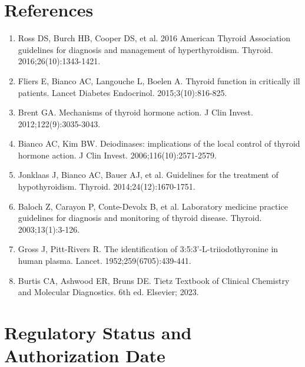 \section*{References}
\begin{enumerate}
  \item Ross DS, Burch HB, Cooper DS, et al. 2016 American Thyroid Association guidelines for diagnosis and management of hyperthyroidism. Thyroid. 2016;26(10):1343-1421.
  \item Fliers E, Bianco AC, Langouche L, Boelen A. Thyroid function in critically ill patients. Lancet Diabetes Endocrinol. 2015;3(10):816-825.
  \item Brent GA. Mechanisms of thyroid hormone action. J Clin Invest. 2012;122(9):3035-3043.
  \item Bianco AC, Kim BW. Deiodinases: implications of the local control of thyroid hormone action. J Clin Invest. 2006;116(10):2571-2579.
  \item Jonklaas J, Bianco AC, Bauer AJ, et al. Guidelines for the treatment of hypothyroidism. Thyroid. 2014;24(12):1670-1751.
  \item Baloch Z, Carayon P, Conte-Devolx B, et al. Laboratory medicine practice guidelines for diagnosis and monitoring of thyroid disease. Thyroid. 2003;13(1):3-126.
  \item Gross J, Pitt-Rivers R. The identification of 3:5:3'-L-triiodothyronine in human plasma. Lancet. 1952;259(6705):439-441.
  \item Burtis CA, Ashwood ER, Bruns DE. Tietz Textbook of Clinical Chemistry and Molecular Diagnostics. 6th ed. Elsevier; 2023.
\end{enumerate}

\clearpage
\section*{Regulatory Status and Authorization Date}

\clearpage
